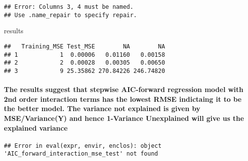 \documentclass[]{article}
\newenvironment{Shaded}{\begin{snugshade}}{\end{snugshade}}
\newcommand{\CommentTok}[1]{\textcolor[rgb]{0.56,0.35,0.01}{\textit{#1}}}
\newcommand{\DecValTok}[1]{\textcolor[rgb]{0.00,0.00,0.81}{#1}}
\newcommand{\KeywordTok}[1]{\textcolor[rgb]{0.13,0.29,0.53}{\textbf{#1}}}
\newcommand{\NormalTok}[1]{#1}
\newcommand{\OperatorTok}[1]{\textcolor[rgb]{0.81,0.36,0.00}{\textbf{#1}}}
\newcommand{\StringTok}[1]{\textcolor[rgb]{0.31,0.60,0.02}{#1}}
\let\oldparagraph\paragraph
\renewcommand{\paragraph}[1]{\oldparagraph{#1}\mbox{}}
\begin{document}
\begin{verbatim}
## Error: Columns 3, 4 must be named.
## Use .name_repair to specify repair.
\end{verbatim}

\begin{Shaded}
\begin{Highlighting}[]
\NormalTok{results}
\end{Highlighting}
\end{Shaded}

\begin{verbatim}
##   Training_MSE Test_MSE        NA        NA
## 1            1  0.00006   0.01160   0.00158
## 2            2  0.00028   0.00305   0.00650
## 3            9 25.35862 270.84226 246.74820
\end{verbatim}

\hypertarget{the-results-suggest-that-stepwise-aic-forward-regression-model-with-2nd-order-interaction-terms-has-the-lowest-rmse-indictaing-it-to-be-the-better-model.-the-variance-not-explained-is-given-by-msevariancey-and-hence-1-variance-unexplained-will-give-us-the-explained-variance}{%
\paragraph{The results suggest that stepwise AIC-forward regression
model with 2nd order interaction terms has the lowest RMSE indictaing it
to be the better model. The variance not explained is given by
MSE/Variance(Y) and hence 1-Variance Unexplained will give us the
explained
variance}\label{the-results-suggest-that-stepwise-aic-forward-regression-model-with-2nd-order-interaction-terms-has-the-lowest-rmse-indictaing-it-to-be-the-better-model.-the-variance-not-explained-is-given-by-msevariancey-and-hence-1-variance-unexplained-will-give-us-the-explained-variance}}

\begin{Shaded}
\end{Shaded}

\begin{verbatim}
## Error in eval(expr, envir, enclos): object 'AIC_forward_interaction_mse_test' not found
\end{verbatim}
\end{document}
